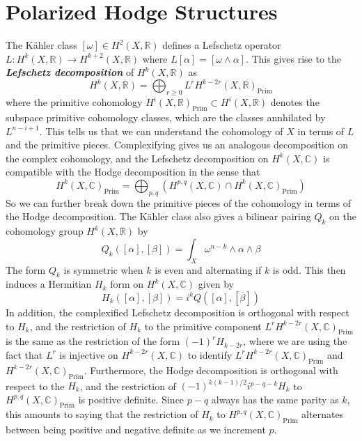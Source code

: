 \documentclass[psamsfonts, 12pt]{amsart}
\theoremstyle{definition}
\theoremstyle{remark}
\newcommand{\R}{\mathbb{R}}
\newcommand{\ib}[1]{\textbf{\textit{#1}}}
\newcommand{\C}{\mathbb{C}}
\begin{document}
\section{Polarized Hodge Structures}
%
The K\"ahler class $[\omega] \in H^2(X,\R)$ defines a Lefschetz operator
$L : H^k(X,\R) \to H^{k+2}(X,\R)$ where $L[\alpha] = [\omega \wedge \alpha]$.
This gives rise to the \ib{Lefschetz decomposition} of $H^k(X,\R)$ as
\[
H^k(X,\R) = \bigoplus_{r\geq 0}L^rH^{k-2r}(X,\R)_{\mathrm{Prim}}
\]
where the primitive cohomology $H^i(X,\R)_{\mathrm{Prim}} \subset H^i(X,\R)$
denotes the subspace primitive cohomology classes, which are the classes annhilated
by $L^{n-i+1}$. This tells us that we can understand the cohomology of $X$ in
terms of $L$ and the primitive pieces. Complexifying gives us an analogous
decomposition on the complex cohomology, and the Lefschetz decomposition on
$H^k(X,\C)$ is compatible with the Hodge decomposition in the sense that
\[
H^k(X,\C)_{\mathrm{Prim}} =
\bigoplus_{p,q}(H^{p,q}(X,\C) \cap H^k(X,\C)_{\mathrm{Prim}})
\]
So we can further break down the primitive pieces of the cohomology in terms
of the Hodge decomposition. The K\"ahler class also gives a bilinear
pairing $Q_k$ on the cohomology group $H^k(X,\R)$ by
\[
Q_k([\alpha],[\beta]) = \int_X \omega^{n-k}\wedge\alpha\wedge\beta
\]
The form $Q_k$ is symmetric when $k$ is even and alternating if $k$ is odd.
This then induces a Hermitian $H_k$ form on $H^k(X,\C)$ given by
\[
H_k([\alpha],[\beta]) = i^kQ([\alpha],[\overline{\beta}])
\]
In addition, the complexified Lefschetz decomposition is orthogonal with respect
to $H_k$, and the restriction of $H_k$ to the primitive component
$L^rH^{k-2r}(X,\C)_{\mathrm{Prim}}$ is the same as the
restriction of the form $(-1)^rH_{k-2r}$, where we are using the fact that
$L^r$ is injective on $H^{k-2r}(X,\C)$ to identify
$L^rH^{k-2r}(X,\C)_{\mathrm{Prim}}$ and $H^{k-2r}(X,\C)_{\mathrm{Prim}}$.
Furthermore, the Hodge decomposition is orthogonal with respect to
the $H_k$, and the restriction of
$(-1)^{k(k-1)/2}i^{p-q-k}H_k$ to $H^{p,q}(X,\C)_{\mathrm{Prim}}$
is positive definite. Since $p-q$ always has the same parity as $k$, this
amounts to saying that the restriction of $H_k$ to $H^{p,q}(X,\C)_{\mathrm{Prim}}$
alternates between being positive and negative definite as we increment $p$.\\
\end{document}
